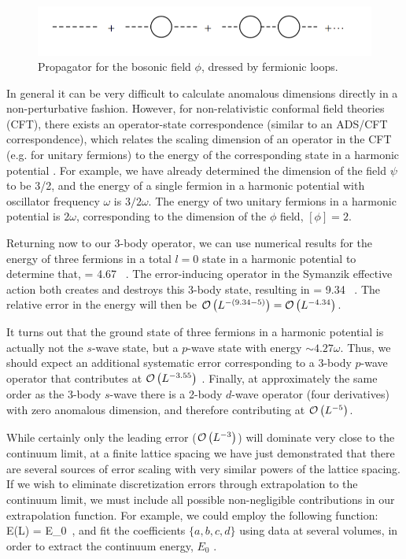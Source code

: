 \begin{figure}
\caption{\label{fig:phiprop}Propagator for the bosonic field $\phi$, dressed by fermionic loops.}
\includegraphics[width=\linewidth]{Chapter5-figures/dimer2}
\end{figure}

In general it can be very difficult to calculate anomalous dimensions directly in a non-perturbative fashion. However, for non-relativistic conformal field theories (CFT), there exists an operator-state correspondence (similar to an ADS/CFT correspondence), which relates the scaling dimension of an operator in the CFT (e.g. for unitary fermions) to the energy of the corresponding state in a harmonic potential \cite{NishidaSonConformal}. For example, we have already determined the dimension of the field $\psi$ to be 3/2, and the energy of a single fermion in a harmonic potential with oscillator frequency $\omega$ is $3/2 \omega$. The energy of two unitary fermions in a harmonic potential is $2\omega$, corresponding to the dimension of the $\phi$ field, $[\phi]=2$. 

Returning now to our 3-body operator, we can use numerical results for the energy of three fermions in a total $l=0$ state in a harmonic potential \cite{2007PhRvL..99w3201B,2011CRPhy..12...86B} to determine that,
\beq
\left[\psi\psi\psi\right] = 4.67 \ .
\eeq
The error-inducing operator in the Symanzik effective action both creates and destroys this 3-body state, resulting in
\beq
\left[\left(\psi\psi\psi\right)^{\dagger}\psi\psi\psi\right] = 9.34 \ .
\eeq
The relative error in the energy will then be ${\mathcal{ O}}\left(L^{-(9.34-5)}\right) = {\mathcal{ O}}\left(L^{-4.34}\right)$.

It turns out that the ground state of three fermions in a harmonic potential is actually not the $s$-wave state, but a $p$-wave state with energy $\sim 4.27\omega$. Thus, we should expect an additional systematic error corresponding to a 3-body $p$-wave operator that contributes at ${\mathcal{ O}}\left(L^{-3.55}\right)$ \cite{2006PhRvL..97o0401W}. Finally, at approximately the same order as the 3-body $s$-wave there is a 2-body $d$-wave operator (four derivatives) with zero anomalous dimension, and therefore contributing at ${\mathcal{ O}}\left(L^{-5}\right)$.

While certainly only the leading error (${\mathcal{ O}}\left(L^{-3}\right)$) will dominate very close to the continuum limit, at a finite lattice spacing we have just demonstrated that there are several sources of error scaling with very similar powers of the lattice spacing. If we wish to eliminate discretization errors through extrapolation to the continuum limit, we must include all possible non-negligible contributions in our extrapolation function. For example, we could employ the following function:
\beq
E(L) = E_0 \ ,
\eeq
and fit the coefficients $\{a,b,c,d\}$ using data at several volumes, in order to extract the continuum energy, $E_0$ \cite{EKLN4}.

